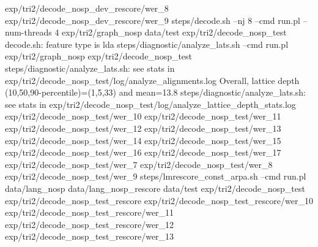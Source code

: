 exp/tri2/decode_nosp_dev_rescore/wer_8
exp/tri2/decode_nosp_dev_rescore/wer_9
steps/decode.sh --nj 8 --cmd run.pl --num-threads 4 exp/tri2/graph_nosp data/test exp/tri2/decode_nosp_test
decode.sh: feature type is lda
steps/diagnostic/analyze_lats.sh --cmd run.pl exp/tri2/graph_nosp exp/tri2/decode_nosp_test
steps/diagnostic/analyze_lats.sh: see stats in exp/tri2/decode_nosp_test/log/analyze_alignments.log
Overall, lattice depth (10,50,90-percentile)=(1,5,33) and mean=13.8
steps/diagnostic/analyze_lats.sh: see stats in exp/tri2/decode_nosp_test/log/analyze_lattice_depth_stats.log
exp/tri2/decode_nosp_test/wer_10
exp/tri2/decode_nosp_test/wer_11
exp/tri2/decode_nosp_test/wer_12
exp/tri2/decode_nosp_test/wer_13
exp/tri2/decode_nosp_test/wer_14
exp/tri2/decode_nosp_test/wer_15
exp/tri2/decode_nosp_test/wer_16
exp/tri2/decode_nosp_test/wer_17
exp/tri2/decode_nosp_test/wer_7
exp/tri2/decode_nosp_test/wer_8
exp/tri2/decode_nosp_test/wer_9
steps/lmrescore_const_arpa.sh --cmd run.pl data/lang_nosp data/lang_nosp_rescore data/test exp/tri2/decode_nosp_test exp/tri2/decode_nosp_test_rescore
exp/tri2/decode_nosp_test_rescore/wer_10
exp/tri2/decode_nosp_test_rescore/wer_11
exp/tri2/decode_nosp_test_rescore/wer_12
exp/tri2/decode_nosp_test_rescore/wer_13
